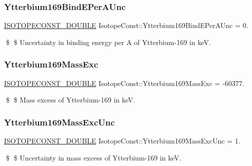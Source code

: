 \subsubsection{\texorpdfstring{Ytterbium169\+Bind\+E\+Per\+A\+Unc}{Ytterbium169BindEPerAUnc}}
{\footnotesize\ttfamily \mbox{\hyperlink{group___isotope_const-_macros_ga8f45a7272ce02c0b4c65c44636ed719a}{I\+S\+O\+T\+O\+P\+E\+C\+O\+N\+S\+T\+\_\+\+D\+O\+U\+B\+LE}} Isotope\+Const\+::\+Ytterbium169\+Bind\+E\+Per\+A\+Unc = 0.}

\$ \$ Uncertainty in binding energy per A of Ytterbium-\/169 in keV. \mbox{\label{group___isotope_const-_ytterbium-_yb169_gafe0c9bc58782963cfba0a7b56a499964}} 
\subsubsection{\texorpdfstring{Ytterbium169\+Mass\+Exc}{Ytterbium169MassExc}}
{\footnotesize\ttfamily \mbox{\hyperlink{group___isotope_const-_macros_ga8f45a7272ce02c0b4c65c44636ed719a}{I\+S\+O\+T\+O\+P\+E\+C\+O\+N\+S\+T\+\_\+\+D\+O\+U\+B\+LE}} Isotope\+Const\+::\+Ytterbium169\+Mass\+Exc = -\/60377.}

\$ \$ Mass excess of Ytterbium-\/169 in keV. \mbox{\label{group___isotope_const-_ytterbium-_yb169_ga0ed265a3e8acb049279018407f35b13e}} 
\subsubsection{\texorpdfstring{Ytterbium169\+Mass\+Exc\+Unc}{Ytterbium169MassExcUnc}}
{\footnotesize\ttfamily \mbox{\hyperlink{group___isotope_const-_macros_ga8f45a7272ce02c0b4c65c44636ed719a}{I\+S\+O\+T\+O\+P\+E\+C\+O\+N\+S\+T\+\_\+\+D\+O\+U\+B\+LE}} Isotope\+Const\+::\+Ytterbium169\+Mass\+Exc\+Unc = 1.}

\$ \$ Uncertainty in mass excess of Ytterbium-\/169 in keV. \mbox{\label{group___isotope_const-_ytterbium-_yb169_ga622e5c8bcc35554985fc73c25d8686c7}} 
